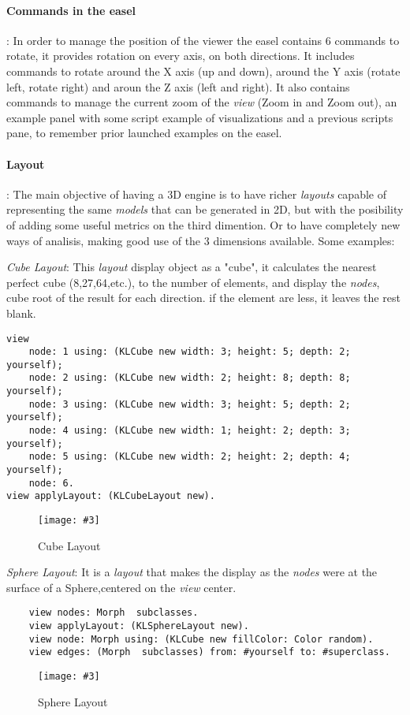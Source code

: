 \documentclass[runningheads]{llncs}
\newcommand{\fig}[4]{
	\begin{figure}[#1]
		\centering
		\texttt{[image: \#3]}
		\caption{\label{fig:#3}#4}
	\end{figure}}
\begin{document}
\paragraph{Commands in the easel}: 
In order to manage the position of the viewer the easel 
contains 6 commands to rotate, it provides rotation on 
every axis, on both directions. It includes commands
to rotate around the X axis (up and down), around the
Y axis (rotate left, rotate right) and aroun the Z axis
(left and right). It also contains commands to manage
the current zoom of the \emph{view} (Zoom in and Zoom out),
an example panel with some script example of visualizations
and a previous scripts pane, to remember prior launched examples
on the easel. %
   

\paragraph{Layout}:
The main objective of having a 3D engine is to have richer 
\emph{layouts} capable of representing the same \emph{models} 
that can be generated in 2D, but with the posibility of adding 
some useful metrics on the third dimention. Or to have 
completely new ways of analisis, making good use of the 3 
dimensions available.
Some examples:

\emph{Cube Layout}: This \emph{layout} display object as a "cube",
it calculates the nearest perfect cube (8,27,64,etc.), to the
number of elements, and display the \emph{nodes}, cube root 
of the result for each direction. if the element are less,
it leaves the rest blank.
\begin{lstlisting}
view 
	node: 1 using: (KLCube new width: 3; height: 5; depth: 2; yourself);
	node: 2 using: (KLCube new width: 2; height: 8; depth: 8; yourself);
	node: 3 using: (KLCube new width: 3; height: 5; depth: 2; yourself);
	node: 4 using: (KLCube new width: 1; height: 2; depth: 3; yourself);
	node: 5 using: (KLCube new width: 2; height: 2; depth: 4; yourself);
	node: 6.
view applyLayout: (KLCubeLayout new). 
\end{lstlisting}
\fig{}{0.3}{figure7.png}{Cube Layout}

\emph{Sphere Layout}: It is a \emph{layout} that makes the display
as the \emph{nodes} were at the surface of a Sphere,centered on the
\emph{view} center. 
\begin{lstlisting}
	view nodes: Morph  subclasses.
	view applyLayout: (KLSphereLayout new).
	view node: Morph using: (KLCube new fillColor: Color random).
	view edges: (Morph  subclasses) from: #yourself to: #superclass.
\end{lstlisting}
\fig{}{0.7}{figure8.png}{Sphere Layout}
\end{document}
